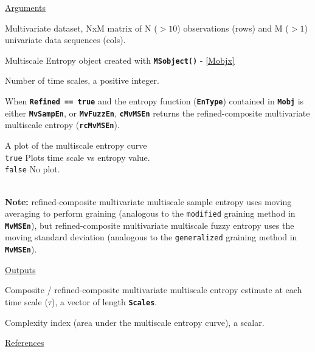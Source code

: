 \documentclass[12pt, a4paper, titlepage, openany]{book}
\begin{document}
\noindent \ul{Arguments}
\begin{description}[labelsep=1cm, labelwidth=2cm, nosep, style=multiline,leftmargin=3cm]\footnotesize
\item[\texttt{Data}]	Multivariate dataset, NxM matrix of N ($>10$) observations (rows) and M ($> 1$) univariate data sequences (cols).
\item[\texttt{Mobj}]	Multiscale Entropy object created with \texttt{\textbf{MSobject()}} - \ref{Mobjx}
\item[\texttt{Scales}]		Number of time scales, a positive integer.
\item[\texttt{Refined}]	 When \textbf{\texttt{Refined == true}} and the entropy function (\textbf{\texttt{EnType}}) contained in  \textbf{\texttt{Mobj}} is either \texttt{\textbf{MvSampEn}}, or \texttt{\textbf{MvFuzzEn}}, \texttt{\textbf{cMvMSEn}} returns the refined-composite multivariate multiscale entropy (\texttt{\textbf{rcMvMSEn}}). \indent \cite{MvSamp1}  \cite{MvFuzz1}
\item[\texttt{Plotx}]		A plot of the multiscale entropy curve\\
							\texttt{true} \hspace{15pt} Plots time scale vs entropy value.\\
							\texttt{false}\hspace{12pt} No plot.\\ 
\end{description}

\ \\ \textbf{Note:} refined-composite multivariate multiscale sample entropy uses moving averaging to perform graining (analogous to the \texttt{modified} graining method in \texttt{\textbf{MvMSEn}}), but refined-composite multivariate multiscale fuzzy entropy uses the moving standard deviation (analogous to the \texttt{generalized} graining method in \texttt{\textbf{MvMSEn}}). 

\noindent \ul{Outputs}
\begin{description}[labelsep=1cm, labelwidth=2cm, nosep, style=multiline,leftmargin=3cm]\footnotesize
\item[\texttt{MSx}]		Composite  / refined-composite multivariate multiscale entropy estimate at each time scale ($\tau$), a vector of length 	\textbf{\texttt{Scales}}.
\item[\texttt{Ci}]		Complexity index (area under the multiscale entropy curve), a scalar.
\end{description}

\noindent \ul{References}\hspace{1cm}
\cite{MvSamp1}  \cite{MvFuzz1} 
\end{document}
